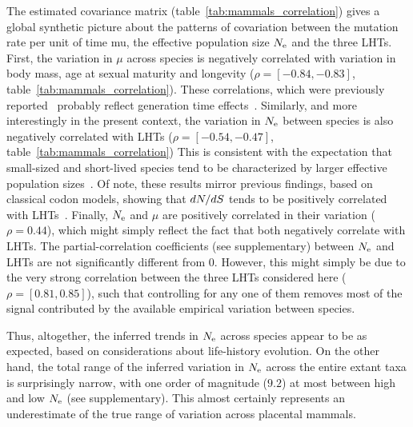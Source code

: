 \documentclass{MBE}
\begin{document}
	The estimated covariance matrix (table~\ref{tab:mammals_correlation}) gives a global synthetic picture about the patterns of covariation between the mutation rate per unit of time mu, the {effective population size} $N_{\text{e}}$ and the three {LHT}s.
	First, the variation in $\mu$ across species is negatively correlated with variation in body mass, age at sexual maturity and longevity ($\rho=[-0.84, -0.83]$, table~\ref{tab:mammals_correlation}).
	These correlations, which were previously reported~\citep{Lartillot2012,Nabholz2013} probably reflect generation time effects~\citep{Amster2016}.
	Similarly, and more interestingly in the present context, the variation in $N_{\text{e}}$ between species is also negatively correlated with {LHT}s ($\rho=[-0.54, -0.47]$, table~\ref{tab:mammals_correlation})
	This is consistent with the expectation that small-sized and short-lived species tend to be characterized by larger effective population sizes~\citep{Romiguier2014}.
	Of note, these results mirror previous findings, based on classical {codon} models, showing that $dN/dS$ tends to be positively correlated with {LHT}s~\citep{Lartillot2012,Nabholz2013,Figuet2017}.
	Finally, $N_{\text{e}}$ and $\mu$ are positively correlated in their variation ($\rho = 0.44$), which might simply reflect the fact that both negatively correlate with {LHT}s.
	The partial-correlation coefficients (see supplementary) between $N_{\text{e}}$ and {LHT}s are not significantly different from 0.
	However, this might simply be due to the very strong correlation between the three {LHT}s considered here ($\rho=[0.81, 0.85]$), such that controlling for any one of them removes most of the signal contributed by the available empirical variation between species.

	Thus, altogether, the inferred trends in $N_{\text{e}}$ across species appear to be as expected, based on considerations about life-history evolution.
	On the other hand, the total range of the inferred variation in $N_{\text{e}}$ across the entire extant taxa is surprisingly narrow, with one order of magnitude ($9.2$) at most between high and low $N_{\text{e}}$ (see supplementary).
	This almost certainly represents an underestimate of the true range of variation across placental mammals.
\end{document}
